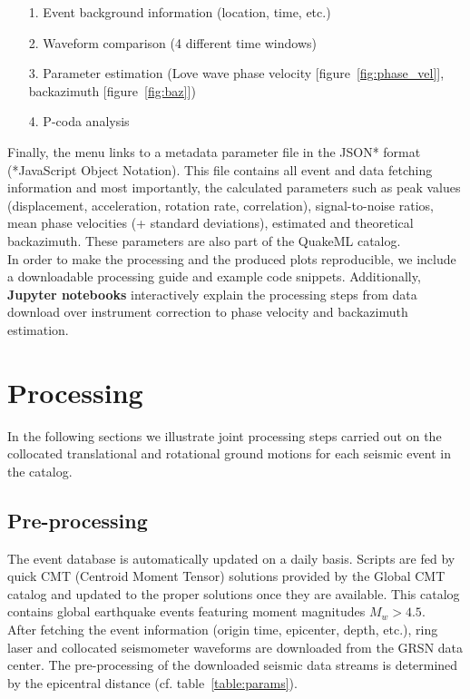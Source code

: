 \documentclass[12pt,reqno,letter]{article}
\begin{document}
\begin{itemize}
	\item[1.] Event background information (location, time, etc.)
	\item[2.] Waveform comparison (4 different time windows)
	\item[3.] Parameter estimation (Love wave phase velocity [figure~\ref{fig:phase_vel}], backazimuth  [figure~\ref{fig:baz}])
	\item[4.] P-coda analysis
\end{itemize}

Finally, the menu links to a metadata parameter file in the JSON* format (*JavaScript Object Notation). This file contains all event and data fetching information and most importantly, the calculated parameters such as  peak values (displacement, acceleration, rotation rate, correlation), signal-to-noise ratios, mean phase velocities (+ standard deviations), estimated and theoretical backazimuth. These parameters are also part of the QuakeML catalog.\\
In order to make the processing and the produced plots reproducible, we include a downloadable processing guide  and example code snippets. Additionally, \textbf{Jupyter notebooks} interactively explain the processing steps from data download over instrument correction to phase velocity and backazimuth estimation.
%
%
\section*{Processing}
In the following sections we illustrate joint processing steps carried out on the collocated translational and rotational ground motions for each seismic event in the catalog. 

\label{sec:processing}
\subsection*{Pre-processing}
The event database is automatically updated on a daily basis. Scripts are fed by quick CMT (Centroid Moment Tensor) solutions provided by the Global CMT catalog \citep{Dziewonski1981, Ekstroem2012} and updated to the proper solutions once they are available. This catalog contains global earthquake events featuring moment magnitudes $M_w > 4.5$.\\
After fetching the event information (origin time, epicenter, depth, etc.), ring laser and collocated seismometer waveforms are downloaded from the GRSN data center.
The pre-processing of the downloaded seismic data streams is determined by the epicentral distance (cf. table~\ref{table:params}).
\end{document}
